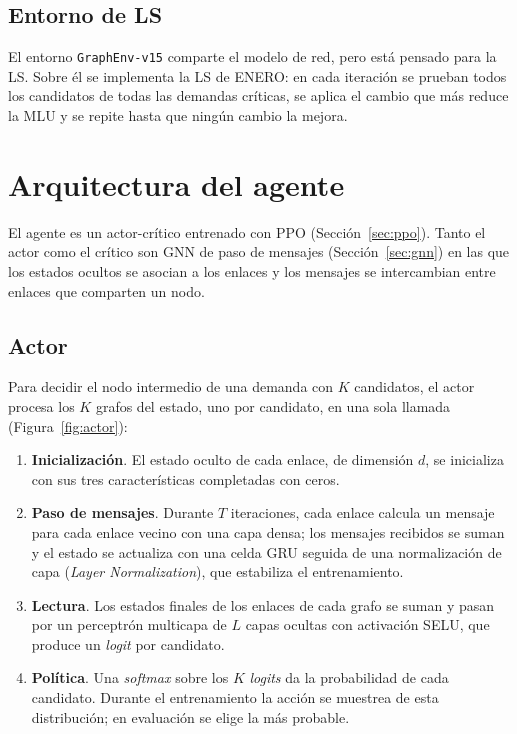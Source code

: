 \subsection{Entorno de LS}\label{sec:env15}

El entorno \texttt{GraphEnv-v15} comparte el modelo de red, pero está pensado para la LS. Sobre él se implementa la LS de ENERO: en cada iteración se prueban todos los candidatos de todas las demandas críticas, se aplica el cambio que más reduce la MLU y se repite hasta que ningún cambio la mejora.

\section{Arquitectura del agente}\label{sec:agente}

El agente es un actor-crítico entrenado con PPO (Sección~\ref{sec:ppo}). Tanto el actor como el crítico son GNN de paso de mensajes (Sección~\ref{sec:gnn}) en las que los estados ocultos se asocian a los enlaces y los mensajes se intercambian entre enlaces que comparten un nodo.

\subsection{Actor}

Para decidir el nodo intermedio de una demanda con $K$ candidatos, el actor procesa los $K$ grafos del estado, uno por candidato, en una sola llamada (Figura~\ref{fig:actor}):

\begin{enumerate}
	\item \textbf{Inicialización}. El estado oculto de cada enlace, de dimensión $d$, se inicializa con sus tres características completadas con ceros.
	\item \textbf{Paso de mensajes}. Durante $T$ iteraciones, cada enlace calcula un mensaje para cada enlace vecino con una capa densa; los mensajes recibidos se suman y el estado se actualiza con una celda GRU seguida de una normalización de capa (\textit{Layer Normalization}), que estabiliza el entrenamiento.
	\item \textbf{Lectura}. Los estados finales de los enlaces de cada grafo se suman y pasan por un perceptrón multicapa de $L$ capas ocultas con activación SELU, que produce un \textit{logit} por candidato.
	\item \textbf{Política}. Una \textit{softmax} sobre los $K$ \textit{logits} da la probabilidad de cada candidato. Durante el entrenamiento la acción se muestrea de esta distribución; en evaluación se elige la más probable.
\end{enumerate}

